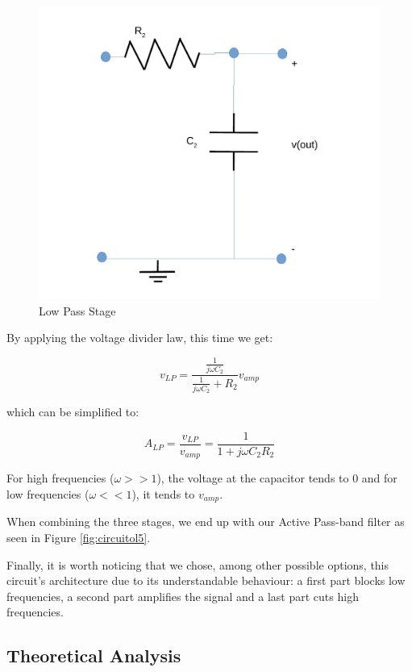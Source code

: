 \begin{figure}[h]
    \centering
    \includegraphics[scale=0.4]{low_pass_l5_old.pdf}
    \caption{Low Pass Stage}
    \label{fig:low_pass}
\end{figure}

By applying the voltage divider law, this time we get:

\begin{equation}
    v_{LP}=\frac{\frac{1}{j \omega C_2}}{\frac{1}{j \omega C_2} + R_2}v_{amp}
\end{equation}

which can be simplified to:

\begin{equation}
    A_{LP}=\frac{v_{LP}}{v_{amp}}=\frac{1}{1 + j \omega C_2 R_2}
\end{equation}

For high frequencies ($\omega >> 1$), the voltage at the capacitor tends to 0 and for low frequencies ($\omega << 1$), it tends to $v_{amp}$.

When combining the three stages, we end up with our Active Pass-band filter as seen in Figure \ref{fig:circuitol5}.

Finally, it is worth noticing that we chose, among other possible options, this circuit's architecture due to its understandable behaviour: a first part blocks low frequencies, a second part amplifies the signal and a last part cuts high frequencies.

\subsection{Theoretical Analysis}
\label{subsec:theo_analysis}

